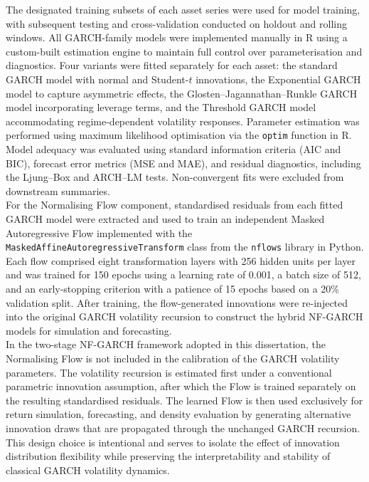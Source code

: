 \documentclass[oneside,12pt]{CUEDthesisPSnPDF}
\begin{document}
\noindent
The designated training subsets of each asset series were used for model training, with subsequent testing and cross-validation conducted on holdout and rolling windows. All GARCH-family models were implemented manually in \textsf{R} using a custom-built estimation engine to maintain full control over parameterisation and diagnostics. Four variants were fitted separately for each asset: the standard GARCH model with normal and Student-$t$ innovations, the Exponential GARCH model to capture asymmetric effects, the Glosten–Jagannathan–Runkle GARCH model incorporating leverage terms, and the Threshold GARCH model accommodating regime-dependent volatility responses. Parameter estimation was performed using maximum likelihood optimisation via the \texttt{optim} function in \textsf{R}. Model adequacy was evaluated using standard information criteria (AIC and BIC), forecast error metrics (MSE and MAE), and residual diagnostics, including the Ljung–Box and ARCH–LM tests. Non-convergent fits were excluded from downstream summaries.\\

\medskip
\noindent
For the Normalising Flow component, standardised residuals from each fitted GARCH model were extracted and used to train an independent Masked Autoregressive Flow implemented with the \texttt{MaskedAffineAutoregressiveTransform} class from the \texttt{nflows} library in \textsf{Python}. Each flow comprised eight transformation layers with 256 hidden units per layer and was trained for 150 epochs using a learning rate of 0.001, a batch size of 512, and an early-stopping criterion with a patience of 15 epochs based on a 20\% validation split. After training, the flow-generated innovations were re-injected into the original GARCH volatility recursion to construct the hybrid NF-GARCH models for simulation and forecasting.\\

In the two-stage NF-GARCH framework adopted in this dissertation, the Normalising Flow is not included in the calibration of the GARCH volatility parameters. The volatility recursion is estimated first under a conventional parametric innovation assumption, after which the Flow is trained separately on the resulting standardised residuals. The learned Flow is then used exclusively for return simulation, forecasting, and density evaluation by generating alternative innovation draws that are propagated through the unchanged GARCH recursion. This design choice is intentional and serves to isolate the effect of innovation distribution flexibility while preserving the interpretability and stability of classical GARCH volatility dynamics.\\
\end{document}
